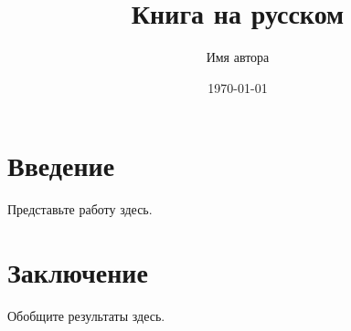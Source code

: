 \documentclass[11pt]{book}
\title{Книга на русском}
\author{Имя автора}
\date{\today}
\begin{document}
\maketitle
\tableofcontents

\chapter{Введение}
Представьте работу здесь.

\chapter{Заключение}
Обобщите результаты здесь.
\end{document}
